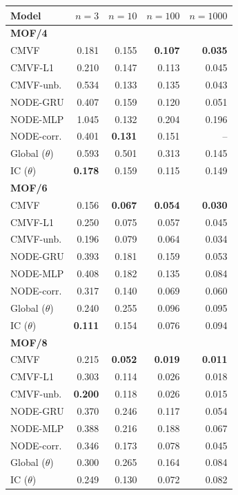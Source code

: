 \begin{tabular*}{\linewidth}{@{\extracolsep{\fill}}lrrrr}
\toprule
Model & $n=3$ & $n=10$ & $n=100$ & $n=1000$ \\
\midrule
\multicolumn{5}{l}{\textbf{MOF/4}} \\
CMVF & 0.181 & 0.155 & \textbf{0.107} & \textbf{0.035} \\
CMVF-L1 & 0.210 & 0.147 & 0.113 & 0.045 \\
CMVF-unb. & 0.534 & 0.133 & 0.135 & 0.043 \\
NODE-GRU & 0.407 & 0.159 & 0.120 & 0.051 \\
NODE-MLP & 1.045 & 0.132 & 0.204 & 0.196 \\
NODE-corr. & 0.401 & \textbf{0.131} & 0.151 & -- \\
Global ($\theta$) & 0.593 & 0.501 & 0.313 & 0.145 \\
IC ($\theta$) & \textbf{0.178} & 0.159 & 0.115 & 0.149 \\
\midrule
\multicolumn{5}{l}{\textbf{MOF/6}} \\
CMVF & 0.156 & \textbf{0.067} & \textbf{0.054} & \textbf{0.030} \\
CMVF-L1 & 0.250 & 0.075 & 0.057 & 0.045 \\
CMVF-unb. & 0.196 & 0.079 & 0.064 & 0.034 \\
NODE-GRU & 0.393 & 0.181 & 0.159 & 0.053 \\
NODE-MLP & 0.408 & 0.182 & 0.135 & 0.084 \\
NODE-corr. & 0.317 & 0.140 & 0.069 & 0.060 \\
Global ($\theta$) & 0.240 & 0.255 & 0.096 & 0.095 \\
IC ($\theta$) & \textbf{0.111} & 0.154 & 0.076 & 0.094 \\
\midrule
\multicolumn{5}{l}{\textbf{MOF/8}} \\
CMVF & 0.215 & \textbf{0.052} & \textbf{0.019} & \textbf{0.011} \\
CMVF-L1 & 0.303 & 0.114 & 0.026 & 0.018 \\
CMVF-unb. & \textbf{0.200} & 0.118 & 0.026 & 0.015 \\
NODE-GRU & 0.370 & 0.246 & 0.117 & 0.054 \\
NODE-MLP & 0.388 & 0.216 & 0.188 & 0.067 \\
NODE-corr. & 0.346 & 0.173 & 0.078 & 0.045 \\
Global ($\theta$) & 0.300 & 0.265 & 0.164 & 0.084 \\
IC ($\theta$) & 0.249 & 0.130 & 0.072 & 0.082 \\

\end{tabular*}
